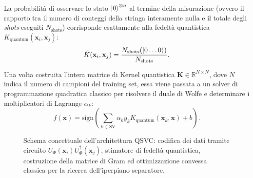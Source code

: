 La probabilità di osservare lo stato $\ket{0}^{\otimes n}$ al termine della misurazione (ovvero il rapporto tra il numero di conteggi della stringa interamente nulla e il totale degli \textit{shots} eseguiti $N_{\text{shots}}$) corrisponde esattamente alla fedeltà quantistica $K_{\text{quantum}}(\mathbf{x}_i, \mathbf{x}_j)$:
\begin{equation}
\hat{K}(\mathbf{x}_i, \mathbf{x}_j) = \frac{N_{\text{shots}}(\ket{0\dots0})}{N_{\text{shots}}}.
\end{equation}

Una volta costruita l'intera matrice di Kernel quantistica $\mathbf{K} \in \mathbb{R}^{N \times N}$, dove $N$ indica il numero di campioni del training set, essa viene passata a un solver di programmazione quadratica classico per risolvere il duale di Wolfe e determinare i moltiplicatori di Lagrange $\alpha_k$:
\begin{equation}
f(\mathbf{x}) = \text{sign}\left( \sum_{k \in \text{SV}} \alpha_k y_k K_{\text{quantum}}(\mathbf{x}_k, \mathbf{x}) + b \right).
\end{equation}

\begin{figure}[htbp]
    \centering
    \caption{\footnotesize Schema concettuale dell'architettura QSVC: codifica dei dati tramite circuito $U_{\Phi}(\mathbf{x}_i) U_{\Phi}^\dagger(\mathbf{x}_j)$, stimatore di fedelt\`a quantistica, costruzione della matrice di Gram ed ottimizzazione convessa classica per la ricerca dell'iperpiano separatore.}
    \label{fig:qsvc_architecture_flow}
\end{figure}

